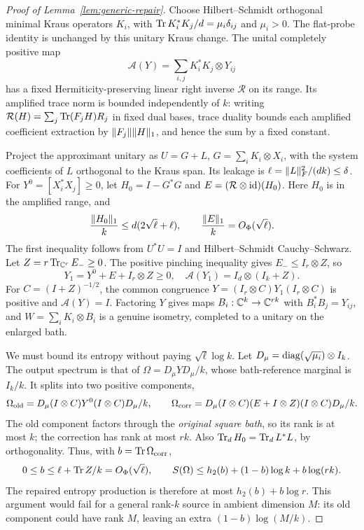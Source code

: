 \begin{proof}[Proof of Lemma~\ref{lem:generic-repair}]
Choose Hilbert--Schmidt orthogonal minimal Kraus operators $K_i$, with
$\operatorname{Tr} K_i^*K_j/d=\mu_i\delta_{ij}$ and $\mu_i>0$. The flat-probe identity is unchanged by this unitary Kraus change.
The unital completely positive map
\[
 \mathcal A(Y)=\sum_{i,j}K_i^*K_j\otimes Y_{ij}
\]
has a fixed Hermiticity-preserving linear right inverse $\mathcal R$ on its range.
Its amplified trace norm is bounded independently of $k$: writing
$\mathcal R(H)=\sum_j\operatorname{Tr}(F_jH)R_j$ in fixed dual bases, trace duality bounds each amplified coefficient extraction by
$\lVert F_j\rVert\lVert H\rVert_1$, and hence the sum by a fixed constant.

Project the approximant unitary as $U=G+L$, $G=\sum_iK_i\otimes X_i$, with the system coefficients of $L$ orthogonal to the
Kraus span. Its leakage is $\ell=\lVert L\rVert_F^2/(dk)\le\delta$.
For $Y^0=[X_i^*X_j]\ge0$, let $H_0=I-G^*G$ and $E=(\mathcal R\otimes\mathrm{id})(H_0)$.
Here $H_0$ is in the amplified range, and
\[
 \frac{\lVert H_0\rVert_1}{k}\le d(2\sqrt\ell+\ell),\qquad
 \frac{\lVert E\rVert_1}{k}=O_\Phi(\sqrt\ell).
\]
The first inequality follows from $U^*U=I$ and Hilbert--Schmidt Cauchy--Schwarz.
Let $Z=r\operatorname{Tr}_{\mathbb C^r}E_-\ge0$. The positive pinching inequality gives
$E_-\le I_r\otimes Z$, so
\[
 Y_1=Y^0+E+I_r\otimes Z\ge0,\quad
 \mathcal A(Y_1)=I_d\otimes(I_k+Z).
\]
For $C=(I+Z)^{-1/2}$, the common congruence
$Y=(I_r\otimes C)Y_1(I_r\otimes C)$ is positive and $\mathcal A(Y)=I$.
Factoring $Y$ gives maps $B_i:\mathbb C^k\to\mathbb C^{rk}$ with $B_i^*B_j=Y_{ij}$, and
$W=\sum_iK_i\otimes B_i$ is a genuine isometry, completed to a unitary on the enlarged bath.

We must bound its entropy without paying $\sqrt\ell\log k$.
Let $D_\mu=\operatorname{diag}(\sqrt{\mu_i})\otimes I_k$.
The output spectrum is that of $\Omega=D_\mu YD_\mu/k$, whose bath-reference marginal is $I_k/k$.
It splits into two positive components,
\[
 \Omega_{\rm old}=D_\mu(I\otimes C)Y^0(I\otimes C)D_\mu/k,\qquad
 \Omega_{\rm corr}=D_\mu(I\otimes C)(E+I\otimes Z)(I\otimes C)D_\mu/k.
\]
The old component factors through the \emph{original square bath}, so its rank is at most $k$; the correction has rank at most $rk$.
Also $\operatorname{Tr}_dH_0=\operatorname{Tr}_dL^*L$, by orthogonality. Thus, with $b=\operatorname{Tr}\Omega_{\rm corr}$,
\[
 0\le b\le\ell+\operatorname{Tr} Z/k=O_\Phi(\sqrt\ell),\qquad
 S(\Omega)\le h_2(b)+(1-b)\log k+b\log(rk).
\]
The repaired entropy production is therefore at most $h_2(b)+b\log r$.
This argument would fail for a general rank-$k$ source in ambient dimension $M$: its old component could have rank $M$,
leaving an extra $(1-b)\log(M/k)$.


\end{proof}
